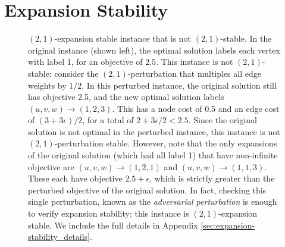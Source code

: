 \section{Expansion Stability}\label{sec:expansion-stability}
\begin{figure}[tb]
  \centering
\begin{subfigure}{.5\linewidth}
  \centering
\end{subfigure}%
\begin{subfigure}{.5\linewidth}
  \centering
\end{subfigure}
  \caption{$(2,1)$-expansion stable instance that is not $(2,1)$-stable. In the original instance (shown left), the optimal solution labels each vertex with label 1, for an objective of $2.5$. This instance is not $(2,1)$-stable: consider the $(2,1)$-perturbation that multiples all edge weights by $1/2$. In this perturbed instance, the original solution still has objective 2.5, and the new optimal solution labels $(u,v,w) \rightarrow (1,2,3)$. This has a node cost of 0.5 and an edge cost of $(3+3\epsilon)/2$, for a total of $2+3\epsilon/2 < 2.5$. Since the original solution is not optimal in the perturbed instance, this instance is not $(2,1)$-perturbation stable. However, note that the only expansions of the original solution (which had all label 1) that have non-infinite objective are $(u,v,w) \rightarrow (1,2,1)$ and $(u,v,w) \rightarrow (1,1,3)$. These each have objective $2.5 + \epsilon$, which is strictly greater than the perturbed objective of the original solution. In fact, checking this single perturbation, known as the \emph{adversarial perturbation} is enough to verify expansion stability: this instance is $(2,1)$-expansion stable. We include the full details in Appendix \ref{sec:expansion-stability_details}.}
\label{fig:counter1}
\end{figure}


